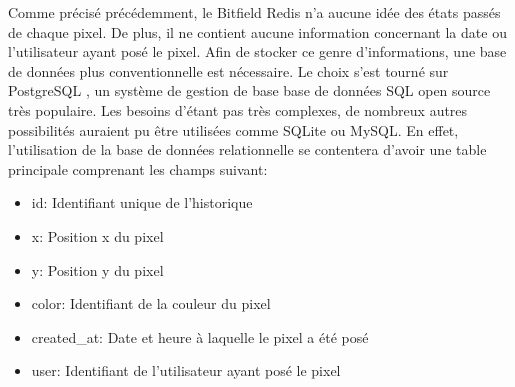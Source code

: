 Comme précisé précédemment, le Bitfield Redis n'a aucune idée des états passés de chaque pixel. De plus, il ne contient aucune information concernant la date ou l'utilisateur ayant posé le pixel. Afin de stocker ce genre d'informations, une base de données plus conventionnelle est nécessaire. Le choix s'est tourné sur PostgreSQL \cite{postgresql}, un système de gestion de base base de données SQL open source très populaire. Les besoins d'étant pas très complexes, de nombreux autres possibilités auraient pu être utilisées comme SQLite ou MySQL. En effet, l'utilisation de la base de données relationnelle se contentera d'avoir une table principale comprenant les champs suivant:

\begin{itemize}
  \item id: Identifiant unique de l'historique
  \item x: Position x du pixel
  \item y: Position y du pixel
  \item color: Identifiant de la couleur du pixel
  \item created\_at: Date et heure à laquelle le pixel a été posé
  \item user: Identifiant de l'utilisateur ayant posé le pixel
\end{itemize}
